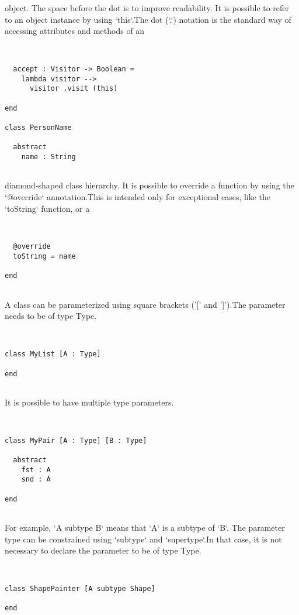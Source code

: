 \documentclass[12pt,a4paper]{article}
\begin{document}
object. The space before the dot is to improve readability. It is possible to refer to an object instance by using `this`.The dot (`.`) notation is the standard way of accessing attributes and methods of an


\begin{lstlisting}


  accept : Visitor -> Boolean =
    lambda visitor -->
      visitor .visit (this)

end

class PersonName

  abstract
    name : String


\end{lstlisting}

diamond-shaped class hierarchy. It is possible to override a function by using the `@override` annotation.This is intended only for exceptional cases, like the `toString` function, or a


\begin{lstlisting}


  @override
  toString = name

end


\end{lstlisting}

A class can be parameterized using square brackets ('[' and ']').The parameter needs to be of type Type. 


\begin{lstlisting}


class MyList [A : Type]

end


\end{lstlisting}

It is possible to have multiple type parameters. 


\begin{lstlisting}


class MyPair [A : Type] [B : Type]

  abstract
    fst : A
    snd : A

end


\end{lstlisting}

For example, `A subtype B` means that `A` is a subtype of `B`. The parameter type can be constrained using `subtype` and `supertype`.In that case, it is not necessary to declare the parameter to be of type Type.


\begin{lstlisting}


class ShapePainter [A subtype Shape]

end


\end{lstlisting}
\end{document}

